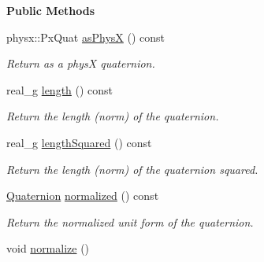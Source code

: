 \begin{Indent}\textbf{ Public Methods}\par
\begin{DoxyCompactItemize}
\item 
\mbox{\label{classrev_1_1_quaternion_a377e6810388607422d03cd1bbe451818}} 
physx\+::\+Px\+Quat \mbox{\hyperlink{classrev_1_1_quaternion_a377e6810388607422d03cd1bbe451818}{as\+PhysX}} () const
\begin{DoxyCompactList}\small\item\em Return as a physX quaternion. \end{DoxyCompactList}\item 
\mbox{\label{classrev_1_1_quaternion_a23138a7e539b2ba50c617f0f52ca414f}} 
real\+\_\+g \mbox{\hyperlink{classrev_1_1_quaternion_a23138a7e539b2ba50c617f0f52ca414f}{length}} () const
\begin{DoxyCompactList}\small\item\em Return the length (norm) of the quaternion. \end{DoxyCompactList}\item 
\mbox{\label{classrev_1_1_quaternion_a1e1eb79f22dab2736c9c900e009b8d01}} 
real\+\_\+g \mbox{\hyperlink{classrev_1_1_quaternion_a1e1eb79f22dab2736c9c900e009b8d01}{length\+Squared}} () const
\begin{DoxyCompactList}\small\item\em Return the length (norm) of the quaternion squared. \end{DoxyCompactList}\item 
\mbox{\label{classrev_1_1_quaternion_aa026d0ceaf60d4145310cf30b91cb53b}} 
\mbox{\hyperlink{classrev_1_1_quaternion}{Quaternion}} \mbox{\hyperlink{classrev_1_1_quaternion_aa026d0ceaf60d4145310cf30b91cb53b}{normalized}} () const
\begin{DoxyCompactList}\small\item\em Return the normalized unit form of the quaternion. \end{DoxyCompactList}\item 
\mbox{\label{classrev_1_1_quaternion_acad449c50646a14531d1be2304fa8461}} 
void \mbox{\hyperlink{classrev_1_1_quaternion_acad449c50646a14531d1be2304fa8461}{normalize}} ()

\end{DoxyCompactItemize}
\end{Indent}

